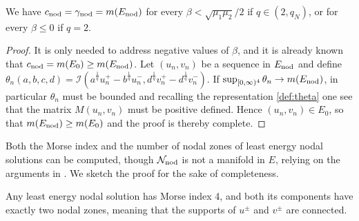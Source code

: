 \documentclass[reqno]{amsart}
\begin{document}
\begin{corollary}
We have $c_{\rm nod}=\gamma_{\rm nod}= m(E_{\rm nod})$ for every
$\beta< \sqrt{\mu_1\mu_2}/2 $ if $q\in (2, q_N)$, or for every $\beta\le 0$  if $q=2$.
\end{corollary}

\begin{proof}
It is only needed to address negative values of $\beta$, and it is already known that
$c_{\rm nod}=m(E_0) \ge m(E_{\rm nod})$.
Let $(u_n,v_n)$ be a sequence in $E_{\rm nod}$ and define
$\theta_n(a,b,c,d)=\mathcal I (a^{\frac{1}q}u_n^+-b^{\frac{1}q}u_n^-,
d^{\frac{1}q}v_n^+-d^{\frac{1}q}v_n^-)$.
If $ \sup_{[0,\infty)^4} \theta_n \to m(E_{\rm nod})$, in particular
$\theta_n$ must be bounded and recalling the representation \eqref{def:theta}
one see that the matrix $M(u_n,v_n)$ must be positive defined.
Hence  $(u_n, v_n)\in E_0$, so that $m(E_{\rm nod})\ge m(E_0)$ and the proof is
thereby complete.
\end{proof}

Both the Morse index and the number of nodal zones of least energy nodal solutions can
be computed, though $\mathcal N_{\rm nod}$ is not a manifold in $E$, relying on the
arguments in \cite{BW_JDE06}.
We sketch the proof for the sake of completeness.

\begin{proposition}\label{prop:Morseindex}
Any least energy nodal solution has Morse index 4, and both its components have exactly
two nodal zones, meaning that the supports of $u^{\pm}$ and $v^{\pm}$ are connected.
\end{proposition}
\end{document}

